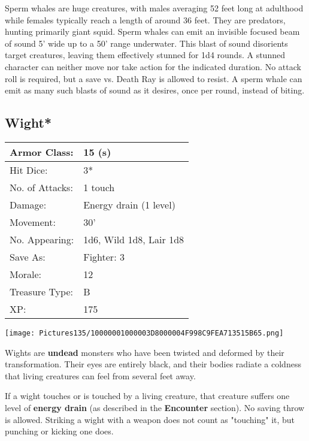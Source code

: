 \documentclass[a4paper,twoside,openany,10pt]{book}
\begin{document}
\begin{multicols}{2}
Sperm whales are huge creatures, with males averaging 52 feet long at adulthood while females typically reach a length of around 36 feet. They are predators, hunting primarily giant squid. Sperm whales can emit an invisible focused beam of sound 5'  wide up to a 50' range underwater. This blast of sound disorients target creatures, leaving them effectively stunned for 1d4 rounds. A stunned character can neither move nor take action for the indicated duration. No attack roll is required, but a save vs. Death Ray is allowed to resist. A sperm whale can emit as many such blasts of sound  as it desires, once per round, instead of biting.

\subsection*{Wight*}\label{wight}

\begin{tabularx}{0.50\textwidth}{@{}lX@{}}
Armor Class: & 15 (s) \\\hline
Hit Dice: & 3* \\\hline
No. of Attacks: & 1 touch \\\hline
Damage: & Energy drain (1 level) \\\hline
Movement: & 30' \\\hline
No. Appearing: & 1d6, Wild 1d8, Lair 1d8 \\\hline
Save As: & Fighter: 3 \\\hline
Morale: & 12 \\\hline
Treasure Type: & B \\\hline
XP: & 175 \\\hline
\end{tabularx}\medskip


\begin{center} \texttt{[image: Pictures135/10000001000003D8000004F998C9FEA713515B65.png]} \end{center}

Wights are \textbf{undead }monsters who have been twisted and deformed by their transformation. Their eyes are entirely black, and their bodies radiate a coldness that living creatures can feel from several feet away. 

If a wight touches or is touched by a living creature, that creature suffers one level of \textbf{energy drain} (as described in the \textbf{Encounter} section). No saving throw is allowed. Striking a wight with a weapon does not count as "touching" it, but punching or kicking one does.


\end{multicols}
\end{document}
